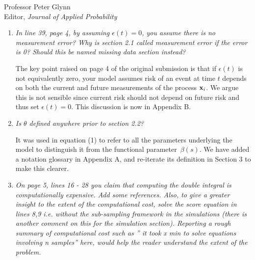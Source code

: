 \documentclass[11pt]{letter} %
\begin{document}
\begin{letter}{Professor
	Peter Glynn\\
	Editor, {\em Journal of Applied Probability}}
\begin{enumerate}
\item {\it In line 39, page 4, by assuming $\epsilon(t) = 0$, you assume there is no measurement error? Why is section 2.1 called measurement error if the error is 0? Should this be named missing data section instead?}

\vspace{5mm}
The key point raised on page 4 of the original submission is that if $\epsilon(t)$ is not equivalently zero, your model assumes risk of an event at time $t$ depends on both the current and future measurements of the process ${\bf x}_i$. We argue this is not sensible since current risk should not depend on future risk and thus set $\epsilon(t) = 0$.  This discussion is now in Appendix B.
\vspace{5mm}

\item  {\it Is $\theta$ defined anywhere prior to section 2.2?}

\vspace{5mm}
It was used in equation (1) to refer to all the parameters underlying the model to distinguish it from the functional parameter~$\beta (s)$. We have added a notation glossary in Appendix A, and re-iterate its definition in Section 3 to make this clearer.
\vspace{5mm}

\item {\it On page 5, lines 16 - 28 you claim that computing the double integral is computationally expensive. Add some references. Also, to give a greater insight to the extent of the computational cost, solve the score equation in lines 8,9 i.e. without the sub-sampling framework in the simulations (there is another comment on this for the simulation section). Reporting a rough summary of computational cost such as ” it took x min to solve equations involving n samples” here, would help the reader understand
the extent of the problem.}


\end{enumerate}
\end{letter}
\end{document}
